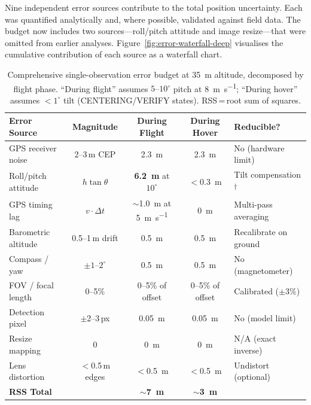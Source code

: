 Nine independent error sources contribute to the total position uncertainty.  Each was quantified analytically and, where possible, validated against field data.  The budget now includes two sources---roll/pitch attitude and image resize---that were omitted from earlier analyses.  Figure~\ref{fig:error-waterfall-deep} visualises the cumulative contribution of each source as a waterfall chart.

\begin{table}[ht]
  \centering
  \caption{Comprehensive single-observation error budget at \SI{35}{\metre} altitude, decomposed by flight phase.  ``During flight'' assumes $5\text{--}10^{\circ}$ pitch at \SI{8}{\metre\per\second}; ``During hover'' assumes $<1^{\circ}$ tilt (CENTERING/VERIFY states).  RSS\,=\,root sum of squares.}
  \label{tab:error-budget}
  \begin{tabular}{lcccl}
    \toprule
    \textbf{Error Source} & \textbf{Magnitude} & \textbf{During Flight} & \textbf{During Hover} & \textbf{Reducible?} \\
    \midrule
    GPS receiver noise   & 2--3\,m CEP     & \SI{2.3}{\metre} & \SI{2.3}{\metre} & No (hardware limit) \\
    Roll/pitch attitude  & $h\tan\theta$   & \textbf{\SI{6.2}{\metre}} at $10^{\circ}$ & $<$\SI{0.3}{\metre} & Tilt compensation\textsuperscript{$\dagger$} \\
    GPS timing lag       & $v \cdot \Delta t$ & $\sim$\SI{1.0}{\metre} at \SI{5}{\metre\per\second} & \SI{0}{\metre} & Multi-pass averaging \\
    Barometric altitude  & 0.5--1\,m drift & \SI{0.5}{\metre} & \SI{0.5}{\metre} & Recalibrate on ground \\
    Compass / yaw        & $\pm1\text{--}2^{\circ}$ & \SI{0.5}{\metre} & \SI{0.5}{\metre} & No (magnetometer) \\
    FOV / focal length   & 0--5\%          & 0--5\% of offset & 0--5\% of offset & Calibrated ($\pm3$\%) \\
    Detection pixel      & $\pm$2--3\,px   & \SI{0.05}{\metre} & \SI{0.05}{\metre} & No (model limit) \\
    Resize mapping       & 0               & \SI{0}{\metre}   & \SI{0}{\metre}   & N/A (exact inverse) \\
    Lens distortion      & $<$0.5\,m edges & $<$\SI{0.5}{\metre} & $<$\SI{0.5}{\metre} & Undistort (optional) \\
    \midrule
    \textbf{RSS Total}   &                 & $\boldsymbol{\sim}$\textbf{\SI{7}{\metre}} & $\boldsymbol{\sim}$\textbf{\SI{3}{\metre}} & \\

\end{tabular}
\end{table}
